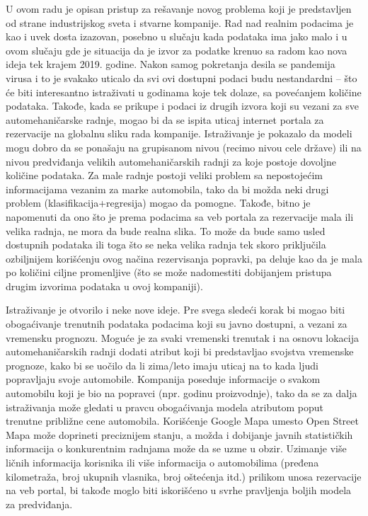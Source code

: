 \documentclass[12pt,oneside]{memoir}
\begin{document}
U ovom radu je opisan pristup za rešavanje novog problema koji je predstavljen od strane industrijskog sveta i stvarne kompanije. Rad nad realnim podacima je kao i uvek dosta izazovan, posebno u slučaju kada podataka ima jako malo i u ovom slučaju gde je situacija da je izvor za podatke krenuo sa radom kao nova ideja tek krajem 2019. godine. Nakon samog pokretanja desila se pandemija virusa i to je svakako uticalo da svi ovi dostupni podaci budu nestandardni -- što će biti interesantno istraživati u godinama koje tek dolaze, sa povećanjem količine podataka. Takođe, kada se prikupe i podaci iz drugih izvora koji su vezani za sve automehaničarske radnje, mogao bi da se ispita uticaj internet portala za rezervacije na globalnu sliku rada kompanije. Istraživanje je pokazalo da modeli mogu dobro da se ponašaju na grupisanom nivou (recimo nivou cele države) ili na nivou predviđanja velikih automehaničarskih radnji za koje postoje dovoljne količine podataka. Za male radnje postoji veliki problem sa nepostojećim informacijama vezanim za marke automobila, tako da bi možda neki drugi problem (klasifikacija+regresija) mogao da pomogne. Takođe, bitno je napomenuti da ono što je prema podacima sa veb portala za rezervacije mala ili velika radnja, ne mora da bude realna slika. To može da bude samo usled dostupnih podataka ili toga što se neka velika radnja tek skoro priključila ozbiljnijem korišćenju ovog načina rezervisanja popravki, pa deluje kao da je mala po količini ciljne promenljive (što se može nadomestiti dobijanjem pristupa drugim izvorima podataka u ovoj kompaniji).

Istraživanje je otvorilo i neke nove ideje. Pre svega sledeći korak bi mogao biti obogaćivanje trenutnih podataka podacima koji su javno dostupni, a vezani za vremensku prognozu. Moguće je za svaki vremenski trenutak i na osnovu lokacija automehaničarskih radnji dodati atribut koji bi predstavljao svojstva vremenske prognoze, kako bi se uočilo da li zima/leto imaju uticaj na to kada ljudi popravljaju svoje automobile. Kompanija poseduje informacije o svakom automobilu koji je bio na popravci (npr. godinu proizvodnje), tako da se za dalja istraživanja može gledati u pravcu obogaćivanja modela atributom poput trenutne približne cene automobila. Korišćenje Google Mapa umesto Open Street Mapa može doprineti preciznijem stanju, a možda i dobijanje javnih statističkih informacija o konkurentnim radnjama može da se uzme u obzir. Uzimanje više ličnih informacija korisnika ili više informacija o automobilima (pređena kilometraža, broj ukupnih vlasnika, broj oštećenja itd.) prilikom unosa rezervacije na veb portal, bi takođe moglo biti iskorišćeno u svrhe pravljenja boljih modela za predviđanja.
\end{document}
